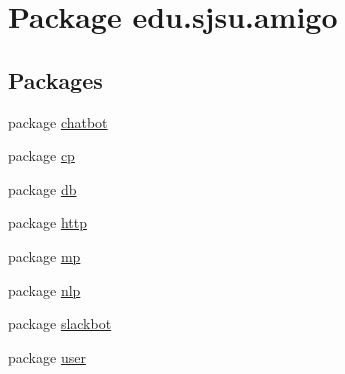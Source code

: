 \hypertarget{namespaceedu_1_1sjsu_1_1amigo}{}\section{Package edu.\+sjsu.\+amigo}
\label{namespaceedu_1_1sjsu_1_1amigo}
\subsection*{Packages}
\begin{DoxyCompactItemize}
\item 
package \hyperlink{namespaceedu_1_1sjsu_1_1amigo_1_1chatbot}{chatbot}
\item 
package \hyperlink{namespaceedu_1_1sjsu_1_1amigo_1_1cp}{cp}
\item 
package \hyperlink{namespaceedu_1_1sjsu_1_1amigo_1_1db}{db}
\item 
package \hyperlink{namespaceedu_1_1sjsu_1_1amigo_1_1http}{http}
\item 
package \hyperlink{namespaceedu_1_1sjsu_1_1amigo_1_1mp}{mp}
\item 
package \hyperlink{namespaceedu_1_1sjsu_1_1amigo_1_1nlp}{nlp}
\item 
package \hyperlink{namespaceedu_1_1sjsu_1_1amigo_1_1slackbot}{slackbot}
\item 
package \hyperlink{namespaceedu_1_1sjsu_1_1amigo_1_1user}{user}
\end{DoxyCompactItemize}
